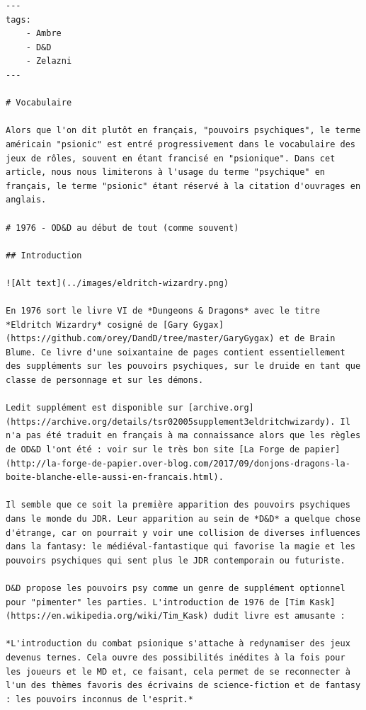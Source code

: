 \documentclass[12pt]{article}
\begin{document}
{\begin{verbatim}
---
tags:
    - Ambre
    - D&D
    - Zelazni
---

# Vocabulaire

Alors que l'on dit plutôt en français, "pouvoirs psychiques", le terme américain "psionic" est entré progressivement dans le vocabulaire des jeux de rôles, souvent en étant francisé en "psionique". Dans cet article, nous nous limiterons à l'usage du terme "psychique" en français, le terme "psionic" étant réservé à la citation d'ouvrages en anglais.

# 1976 - OD&D au début de tout (comme souvent)

## Introduction

![Alt text](../images/eldritch-wizardry.png)

En 1976 sort le livre VI de *Dungeons & Dragons* avec le titre *Eldritch Wizardry* cosigné de [Gary Gygax](https://github.com/orey/DandD/tree/master/GaryGygax) et de Brain Blume. Ce livre d'une soixantaine de pages contient essentiellement des suppléments sur les pouvoirs psychiques, sur le druide en tant que classe de personnage et sur les démons.

Ledit supplément est disponible sur [archive.org](https://archive.org/details/tsr02005supplement3eldritchwizardy). Il n'a pas été traduit en français à ma connaissance alors que les règles de OD&D l'ont été : voir sur le très bon site [La Forge de papier](http://la-forge-de-papier.over-blog.com/2017/09/donjons-dragons-la-boite-blanche-elle-aussi-en-francais.html).

Il semble que ce soit la première apparition des pouvoirs psychiques dans le monde du JDR. Leur apparition au sein de *D&D* a quelque chose d'étrange, car on pourrait y voir une collision de diverses influences dans la fantasy: le médiéval-fantastique qui favorise la magie et les pouvoirs psychiques qui sent plus le JDR contemporain ou futuriste.

D&D propose les pouvoirs psy comme un genre de supplément optionnel pour "pimenter" les parties. L'introduction de 1976 de [Tim Kask](https://en.wikipedia.org/wiki/Tim_Kask) dudit livre est amusante :

*L'introduction du combat psionique s'attache à redynamiser des jeux devenus ternes. Cela ouvre des possibilités inédites à la fois pour les joueurs et le MD et, ce faisant, cela permet de se reconnecter à l'un des thèmes favoris des écrivains de science-fiction et de fantasy : les pouvoirs inconnus de l'esprit.*


\end{verbatim}}
\end{document}
